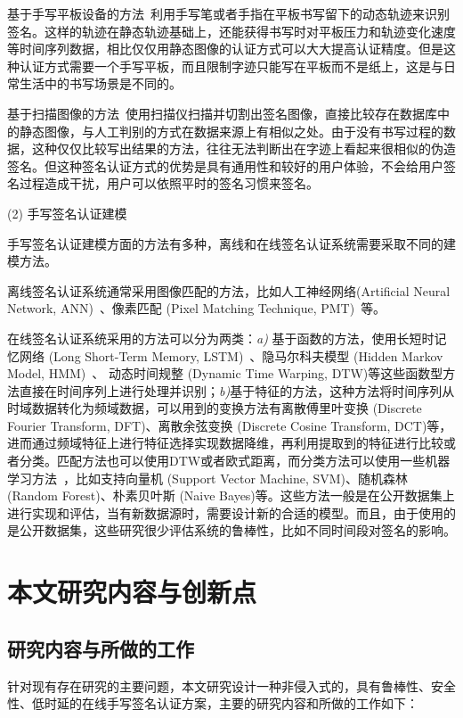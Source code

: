 基于手写平板设备的方法~\cite{fischer2015robust,kholmatov2005identity,sae2013simple}利用手写笔或者手指在平板书写留下的动态轨迹来识别签名。这样的轨迹在静态轨迹基础上，还能获得书写时对平板压力和轨迹变化速度等时间序列数据，相比仅仅用静态图像的认证方式可以大大提高认证精度。但是这种认证方式需要一个手写平板，而且限制字迹只能写在平板而不是纸上，这是与日常生活中的书写场景是不同的。

基于扫描图像的方法~\cite{hafemann2017learning,hafemann2018fixed,ferrer2005offline,kalera2004offline}使用扫描仪扫描并切割出签名图像，直接比较存在数据库中的静态图像，与人工判别的方式在数据来源上有相似之处。由于没有书写过程的数据，这种仅仅比较写出结果的方法，往往无法判断出在字迹上看起来很相似的伪造签名。但这种签名认证方式的优势是具有通用性和较好的用户体验，不会给用户签名过程造成干扰，用户可以依照平时的签名习惯来签名。

(2) 手写签名认证建模

手写签名认证建模方面的方法有多种，离线和在线签名认证系统需要采取不同的建模方法。

离线签名认证系统通常采用图像匹配的方法，比如人工神经网络(Artificial Neural Network, ANN)~\cite{chandra2016offline}、像素匹配 (Pixel Matching Technique, PMT)~\cite{bhattacharya2013offline}等。 

在线签名认证系统采用的方法可以分为两类：\textit{a)} 基于函数的方法，使用长短时记忆网络 (Long Short-Term Memory, LSTM)~\cite{hochreiter1997long}、隐马尔科夫模型 (Hidden Markov Model, HMM)~\cite{rabiner1986introduction}、 动态时间规整 (Dynamic Time Warping, DTW)等这些函数型方法直接在时间序列上进行处理并识别；\textit{b)}基于特征的方法，这种方法将时间序列从时域数据转化为频域数据，可以用到的变换方法有离散傅里叶变换 (Discrete Fourier Transform, DFT)、离散余弦变换 (Discrete Cosine Transform, DCT)等，进而通过频域特征上进行特征选择实现数据降维，再利用提取到的特征进行比较或者分类。匹配方法也可以使用DTW或者欧式距离，而分类方法可以使用一些机器学习方法~\cite{周志华2016机器学习}，比如支持向量机 (Support Vector Machine, SVM)、随机森林 (Random Forest)、朴素贝叶斯 (Naive Bayes)等。这些方法一般是在公开数据集上进行实现和评估，当有新数据源时，需要设计新的合适的模型。而且，由于使用的是公开数据集，这些研究很少评估系统的鲁棒性，比如不同时间段对签名的影响。

\section{本文研究内容与创新点}
\subsection{研究内容与所做的工作}
针对现有存在研究的主要问题，本文研究设计一种非侵入式的，具有鲁棒性、安全性、低时延的在线手写签名认证方案，主要的研究内容和所做的工作如下：

